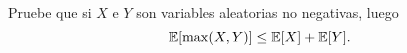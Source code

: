 \begin{statement}{11}
  Pruebe que si $X$ e $Y$ son variables aleatorias no negativas, luego
  \[
    \mathbb{E}[\max(X, Y)] \leq \mathbb{E}[X] + \mathbb{E}[Y].
  \]
\end{statement}
